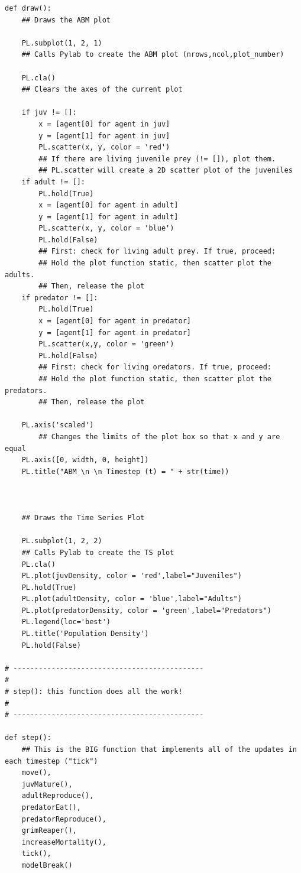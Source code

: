 \documentclass[12pt]{article}
\begin{document}
\begin{lstlisting}
def draw():
    ## Draws the ABM plot
    
    PL.subplot(1, 2, 1)
    ## Calls Pylab to create the ABM plot (nrows,ncol,plot_number)
    
    PL.cla()
    ## Clears the axes of the current plot
    
    if juv != []:
        x = [agent[0] for agent in juv]
        y = [agent[1] for agent in juv]
        PL.scatter(x, y, color = 'red')
        ## If there are living juvenile prey (!= []), plot them.
        ## PL.scatter will create a 2D scatter plot of the juveniles
    if adult != []:
        PL.hold(True)
        x = [agent[0] for agent in adult]
        y = [agent[1] for agent in adult]
        PL.scatter(x, y, color = 'blue')
        PL.hold(False)
        ## First: check for living adult prey. If true, proceed:
        ## Hold the plot function static, then scatter plot the adults.
        ## Then, release the plot
    if predator != []:
        PL.hold(True)
        x = [agent[0] for agent in predator]
        y = [agent[1] for agent in predator]
        PL.scatter(x,y, color = 'green')
        PL.hold(False)
        ## First: check for living oredators. If true, proceed:
        ## Hold the plot function static, then scatter plot the predators.
        ## Then, release the plot
        
    PL.axis('scaled')
        ## Changes the limits of the plot box so that x and y are equal
    PL.axis([0, width, 0, height])
    PL.title("ABM \n \n Timestep (t) = " + str(time))



    ## Draws the Time Series Plot
    
    PL.subplot(1, 2, 2)
    ## Calls Pylab to create the TS plot
    PL.cla()
    PL.plot(juvDensity, color = 'red',label="Juveniles")
    PL.hold(True)
    PL.plot(adultDensity, color = 'blue',label="Adults")
    PL.plot(predatorDensity, color = 'green',label="Predators")
    PL.legend(loc='best')
    PL.title('Population Density')
    PL.hold(False)

# ---------------------------------------------
#
# step(): this function does all the work!
#
# ---------------------------------------------

def step():
    ## This is the BIG function that implements all of the updates in each timestep ("tick")
    move(),
    juvMature(),
    adultReproduce(),
    predatorEat(),
    predatorReproduce(),
    grimReaper(),
    increaseMortality(),
    tick(),
    modelBreak()


\end{lstlisting}
\end{document}
